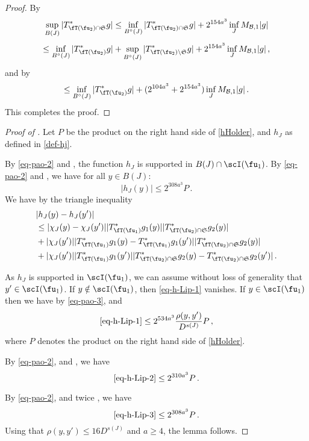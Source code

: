     \begin{proof}
        By 
        $$
            \sup_{B(J)} |T^*_{\fT(\fu_2) \cap \mathfrak{S}} g| \le \inf_{B^\circ{}(J)} |T_{\fT(\fu_2) \cap \mathfrak{S}}^* g| + 2^{154a^3} \inf_{J} M_{\mathcal{B}, 1} |g|
        $$
        $$
            \le \inf_{B^\circ{}(J)} |T_{\fT(\fu_2)}^* g| + \sup_{B^\circ{}(J)} |T_{\fT(\fu_2) \setminus \mathfrak{S}}^* g| + 2^{154a^3} \inf_{J} M_{\mathcal{B}, 1} |g|\,,
        $$
        and by 
        $$
            \le \inf_{B^\circ{}(J)} |T_{\fT(\fu_2)}^* g| + (2^{104a^3} + 2^{154a^3}) \inf_{J} M_{\mathcal{B}, 1} |g|\,.
        $$
        This completes the proof.
    \end{proof}



    \begin{proof}[Proof of ]
        Let $P$ be the product on the right hand side of \eqref{hHolder}, and $h_J$ as defined in \eqref{def-hj}.

        By \eqref{eq-pao-2} and , the function $h_J$ is supported in $B(J) \cap \scI(\fu_1)$.
        By \eqref{eq-pao-2} and , we have for all $y \in B(J)$:
        $$
            |h_J(y)| \le 2^{308a^3} P\,.
        $$
        We have by the triangle inequality
        \begin{align}
            &|h_J(y) - h_J(y')|\nonumber\\
            \label{eq-h-Lip-1}
            &\le |\chi_J(y) - \chi_J(y')| |T_{\fT(\fu_1)}^* g_1(y)| |T_{\fT(\fu_2) \cap \mathfrak{S}}^* g_2(y)|\\
            \label{eq-h-Lip-2}
            & + |\chi_J(y')| |T_{\fT(\fu_1)}^* g_1(y) - T_{\fT(\fu_1)}^* g_1(y')| |T_{\fT(\fu_2) \cap \mathfrak{S}}^* g_2(y)|\\
            \label{eq-h-Lip-3}
            & + |\chi_J(y')| |T_{\fT(\fu_1)}^* g_1(y')| |T_{\fT(\fu_2) \cap \mathfrak{S}}^* g_2(y) - T_{\fT(\fu_2) \cap \mathfrak{S}}^* g_2(y')|\,.
        \end{align}

        As $h_J$ is supported in $\scI(\fu_1)$, we can assume without loss of generality that $y' \in \scI(\fu_1)$.
        If $y \notin \scI(\fu_1)$, then \eqref{eq-h-Lip-1} vanishes. If $y \in \scI(\fu_1)$ then we have by \eqref{eq-pao-3},  and 
        $$
            \eqref{eq-h-Lip-1} \le 2^{534a^3} \frac{\rho(y,y')}{D^{s(J)}} P\,,
        $$
        where $P$ denotes the product on the right hand side of \eqref{hHolder}.

        By \eqref{eq-pao-2},  and , we have
        $$
            \eqref{eq-h-Lip-2} \le 2^{310a^3} P\,.
         $$

        By \eqref{eq-pao-2}, and twice , we have
        $$
            \eqref{eq-h-Lip-3} \le 2^{308a^3} P\,.
        $$
        Using that $\rho(y,y') \le 16D^{s(J)}$ and $a \ge 4$, the lemma follows.
    \end{proof}

